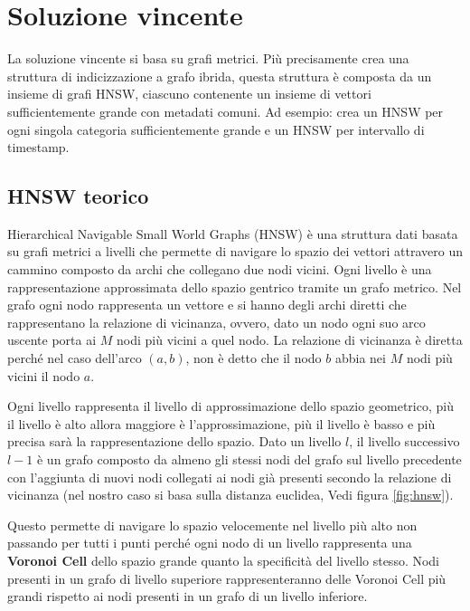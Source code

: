 \chapter{Soluzione vincente}
La soluzione vincente si basa su grafi metrici.
Più precisamente crea una struttura di indicizzazione a grafo ibrida, questa struttura 
è composta da un insieme di grafi HNSW, ciascuno contenente un insieme di vettori 
sufficientemente grande con metadati comuni. Ad esempio: crea un HNSW per ogni singola 
categoria sufficientemente grande e un HNSW per intervallo di timestamp.

\section{HNSW teorico}
Hierarchical Navigable Small World Graphs (HNSW) è una struttura dati basata su 
grafi metrici a livelli che permette di navigare
lo spazio dei vettori attravero un cammino composto da archi che collegano due nodi 
vicini. Ogni livello è una 
rappresentazione approssimata dello spazio gentrico tramite un grafo metrico. Nel grafo ogni nodo rappresenta 
un vettore e si hanno degli archi diretti che rappresentano la relazione di vicinanza,
ovvero, dato un nodo ogni suo arco uscente porta ai $M$ nodi più vicini a quel nodo. La relazione 
di vicinanza è diretta perché nel caso dell'arco $(a,b)$, non è detto che il nodo 
$b$ abbia nei $M$ nodi più vicini il nodo $a$.

Ogni livello rappresenta il livello di approssimazione dello spazio geometrico, 
più il livello è alto allora maggiore è l'approssimazione, più il livello è basso 
e più precisa sarà la rappresentazione dello spazio. Dato un livello $l$, il livello 
successivo $l-1$ è un grafo composto da almeno gli stessi nodi del grafo sul livello 
precedente con l'aggiunta di nuovi nodi collegati ai nodi già presenti secondo 
la relazione di vicinanza (nel nostro caso si basa sulla distanza euclidea, Vedi 
figura \ref{fig:hnsw}). 

Questo permette di navigare lo spazio velocemente nel livello più alto non passando 
per tutti i punti perché ogni nodo di un livello rappresenta una \textbf{Voronoi Cell} dello spazio grande 
quanto la specificità del livello stesso. Nodi presenti in un grafo di livello 
superiore rappresenteranno delle Voronoi Cell più grandi rispetto ai nodi 
presenti in un grafo di un livello inferiore.

